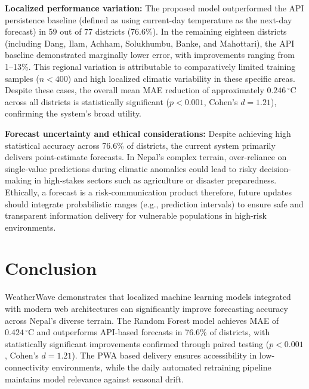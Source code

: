 \documentclass[conference]{IEEEtran}
\begin{document}
\textbf{Localized performance variation:} The proposed model outperformed the API persistence baseline (defined as using current-day temperature as the next-day forecast) in 59 out of 77 districts (76.6\%). In the remaining eighteen districts (including Dang, Ilam, Achham, Solukhumbu, Banke, and Mahottari), the API baseline demonstrated marginally lower error, with improvements ranging from 1--13\%. This regional variation is attributable to comparatively limited training samples ($n < 400$) and high localized climatic variability in these specific areas. Despite these cases, the overall mean MAE reduction of approximately $0.246\,^\circ\text{C}$ across all districts is statistically significant ($p < 0.001$, Cohen's $d = 1.21$), confirming the system's broad utility.


\textbf{Forecast uncertainty and ethical considerations:} Despite achieving high statistical accuracy across 76.6\% of districts, the current system primarily delivers point-estimate forecasts. In Nepal's complex terrain, over-reliance on single-value predictions during climatic anomalies could lead to risky decision-making in high-stakes sectors such as agriculture or disaster preparedness. Ethically, a forecast is a risk-communication product therefore, future updates should integrate probabilistic ranges (e.g., prediction intervals) to ensure safe and transparent information delivery for vulnerable populations in high-risk environments.
\section{Conclusion}
WeatherWave demonstrates that localized machine learning models integrated with modern web architectures can significantly improve forecasting accuracy across Nepal's diverse terrain. The Random Forest model achieves MAE of $0.424\,^\circ\text{C}$ and outperforms API-based forecasts in 76.6\% of districts, with statistically significant improvements confirmed through paired testing ($p < 0.001$, Cohen's $d = 1.21$). The PWA based delivery ensures accessibility in low-connectivity environments, while the daily automated retraining pipeline maintains model relevance against seasonal drift.
\end{document}
